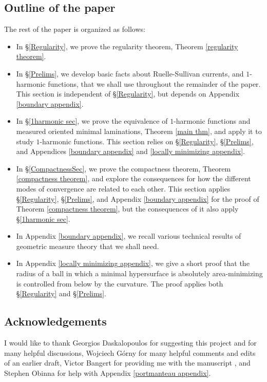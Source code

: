 \documentclass[reqno,11pt]{amsart}
\theoremstyle{definition}
\numberwithin{equation}{section}
\begin{document}
\subsection{Outline of the paper}
The rest of the paper is organized as follows:
\begin{itemize}
\item In \S\ref{Regularity}, we prove the regularity theorem, Theorem \ref{regularity theorem}.
\item In \S\ref{Prelims}, we develop basic facts about Ruelle-Sullivan currents, and $1$-harmonic functions, that we shall use throughout the remainder of the paper. This section is independent of \S\ref{Regularity}, but depends on Appendix \ref{boundary appendix}.
\item In \S\ref{1harmonic sec}, we prove the equivalence of $1$-harmonic functions and measured oriented minimal laminations, Theorem \ref{main thm}, and apply it to study $1$-harmonic functions. This section relies on \S\ref{Regularity}, \S\ref{Prelims}, and Appendices \ref{boundary appendix} and \ref{locally minimizing appendix}.
\item In \S\ref{CompactnessSec}, we prove the compactness theorem, Theorem \ref{compactness theorem}, and explore the consequences for how the different modes of convergence are related to each other. This section applies \S\ref{Regularity}, \S\ref{Prelims}, and Appendix \ref{boundary appendix} for the proof of Theorem \ref{compactness theorem}, but the consequences of it also apply \S\ref{1harmonic sec}.
\item In Appendix \ref{boundary appendix}, we recall various technical results of geometric measure theory that we shall need.
\item In Appendix \ref{locally minimizing appendix}, we give a short proof that the radius of a ball in which a minimal hypersurface is absolutely area-minimizing is controlled from below by the curvature. The proof applies both \S\ref{Regularity} and \S\ref{Prelims}.
\end{itemize}


\subsection{Acknowledgements}
I would like to thank Georgios Daskalopoulos for suggesting this project and for many helpful discussions, Wojciech Górny for many helpful comments and edits of an earlier draft, Victor Bangert for providing me with the manuscript \cite{Auer12}, and Stephen Obinna for help with Appendix \ref{portmanteau appendix}.
\end{document}
